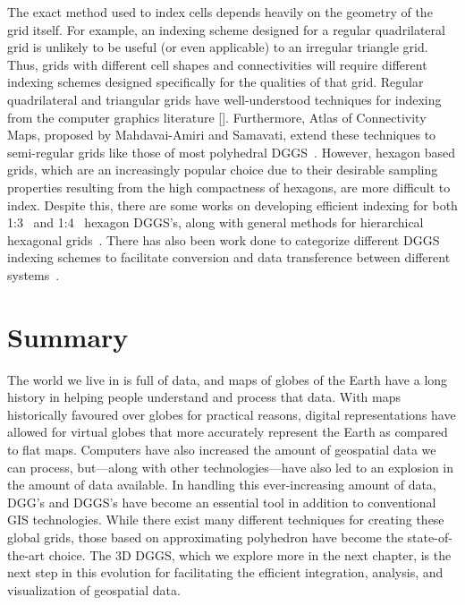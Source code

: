 The exact method used to index cells depends heavily on the geometry of the grid itself.
For example, an indexing scheme designed for a regular quadrilateral grid is unlikely to be useful (or even applicable) to an irregular triangle grid.
Thus, grids with different cell shapes and connectivities will require different indexing schemes designed specifically for the qualities of that grid.
Regular quadrilateral and triangular grids have well-understood techniques for indexing from the computer graphics literature [].
Furthermore, Atlas of Connectivity Maps, proposed by Mahdavai-Amiri and Samavati, extend these techniques to semi-regular grids like those of most polyhedral DGGS~\cite{mahdavi2014atlas}.
However, hexagon based grids, which are an increasingly popular choice due to their desirable sampling properties resulting from the high compactness of hexagons, are more difficult to index.
Despite this, there are some works on developing efficient indexing for both 1:3~\cite{vince2006indexing} and 1:4~\cite{tong2013efficient} hexagon DGGS's, along with general methods for hierarchical hexagonal grids~\cite{mahdavi2015hexagonal}.
There has also been work done to categorize different DGGS indexing schemes to facilitate conversion and data transference between different systems~\cite{mahdavi2015categorization}.


\section{Summary}
The world we live in is full of data, and maps of globes of the Earth have a long history in helping people understand and process that data.
With maps historically favoured over globes for practical reasons, digital representations have allowed for virtual globes that more accurately represent the Earth as compared to flat maps.
Computers have also increased the amount of geospatial data we can process, but---along with other technologies---have also led to an explosion in the amount of data available.
In handling this ever-increasing amount of data, DGG's and DGGS's have become an essential tool in addition to conventional GIS technologies.
While there exist many different techniques for creating these global grids, those based on approximating polyhedron have become the state-of-the-art choice. The 3D DGGS, which we explore more in the next chapter, is the next step in this evolution for facilitating the efficient integration, analysis, and visualization of geospatial data.


